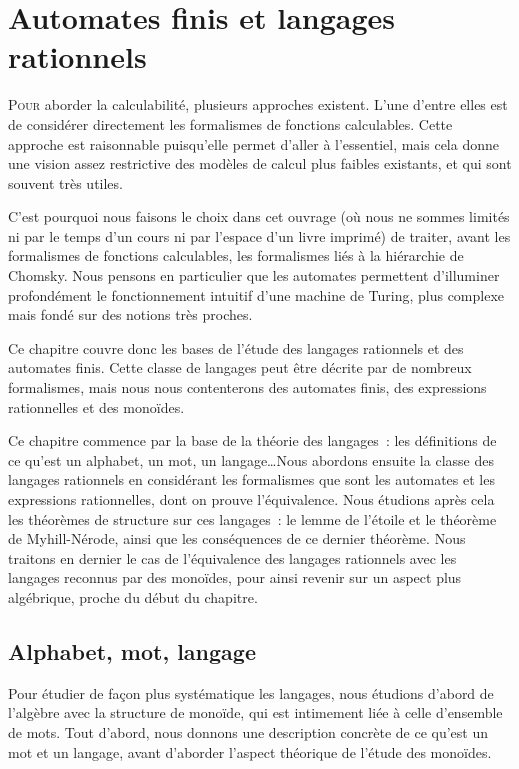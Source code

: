 \chapter[Langages rationnels]{Automates finis et langages rationnels}
\label{chp.auto}

\minitoc

\lettrine{P}{our} aborder la calculabilité, plusieurs approches existent. L'une
d'entre elles est de considérer directement les formalismes de fonctions
calculables. Cette approche est raisonnable puisqu'elle permet d'aller à
l'essentiel, mais cela donne une vision assez restrictive des modèles de calcul
plus faibles existants, et qui sont souvent très utiles.

C'est pourquoi nous faisons le choix dans cet ouvrage (où nous ne sommes limités
ni par le temps d'un cours ni par l'espace d'un livre imprimé) de traiter, avant
les formalismes de fonctions calculables, les formalismes liés à la hiérarchie
de Chomsky. Nous pensons en particulier que les automates permettent d'illuminer
profondément le fonctionnement intuitif d'une machine de Turing, plus complexe
mais fondé sur des notions très proches.

Ce chapitre couvre donc les bases de l'étude des langages rationnels et des
automates finis. Cette classe de langages peut être décrite par de nombreux
formalismes, mais nous nous contenterons des automates finis, des expressions
rationnelles et des monoïdes.

Ce chapitre commence par la base de la théorie des langages~: les définitions
de ce qu'est un alphabet, un mot, un langage\ldots Nous abordons ensuite la
classe des langages rationnels en considérant les formalismes que sont les
automates et les expressions rationnelles, dont on prouve l'équivalence.
Nous étudions après cela les théorèmes de structure sur ces
langages~: le lemme de l'étoile et le théorème de Myhill-Nérode, ainsi que les
conséquences de ce dernier théorème. Nous traitons en dernier le cas de
l'équivalence des langages rationnels avec les langages reconnus par des
monoïdes, pour ainsi revenir sur un aspect plus algébrique, proche du début du
chapitre.

\section{Alphabet, mot, langage}

Pour étudier de façon plus systématique les langages, nous étudions d'abord de
l'algèbre avec la structure de monoïde, qui est intimement liée à celle
d'ensemble de mots. Tout d'abord, nous donnons une description concrète de ce
qu'est un mot et un langage, avant d'aborder l'aspect théorique de l'étude des
monoïdes.

